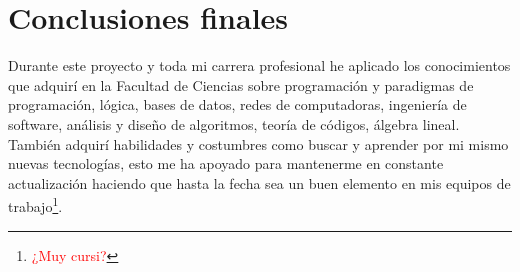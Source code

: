 \section{Conclusiones finales}

Durante este proyecto y toda mi carrera profesional he aplicado los conocimientos que adquirí en la Facultad de Ciencias sobre programación y paradigmas de programación, lógica, bases de datos, redes de computadoras, ingeniería de software, análisis y diseño de algoritmos, teoría de códigos, álgebra lineal. También adquirí habilidades y costumbres como buscar y aprender por mi mismo nuevas tecnologías, esto me ha apoyado para mantenerme en constante actualización haciendo que hasta la fecha sea un buen elemento en mis equipos de trabajo\footnote{\textcolor{red}{¿Muy cursi?}}.
